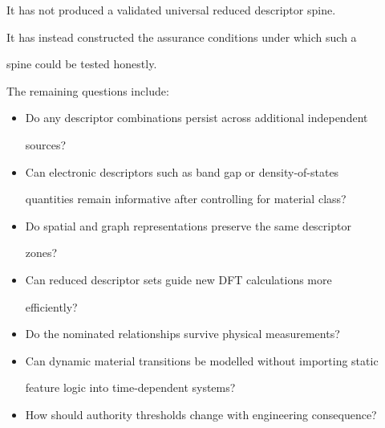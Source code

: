 \documentclass[11pt,a4paper,oneside]{report}
\begin{document}
It has not produced a validated universal reduced descriptor spine.



It has instead constructed the assurance conditions under which such a

spine could be tested honestly.



The remaining questions include:



\begin{itemize}



\item

Do any descriptor combinations persist across additional independent

sources?



\item

Can electronic descriptors such as band gap or density-of-states

quantities remain informative after controlling for material class?



\item

Do spatial and graph representations preserve the same descriptor

zones?



\item

Can reduced descriptor sets guide new DFT calculations more

efficiently?



\item

Do the nominated relationships survive physical measurements?



\item

Can dynamic material transitions be modelled without importing static

feature logic into time-dependent systems?



\item

How should authority thresholds change with engineering consequence?



\end{itemize}
\end{document}
